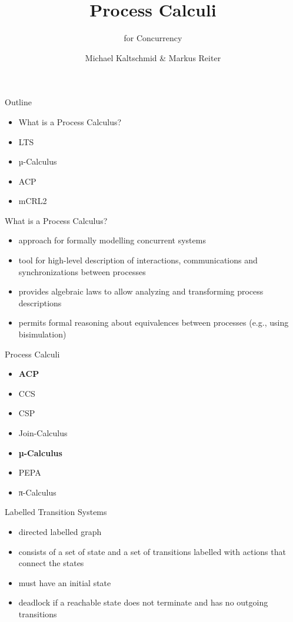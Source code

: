 \documentclass[aspectratio=1610]{beamer}
\title{Process Calculi}
\subtitle{for Concurrency}
\author{Michael Kaltschmid \& Markus Reiter}
\date{}
\begin{document}
  \maketitle

  \begin{frame}{Outline}
    \begin{itemize}
      \item What is a Process Calculus?
      \item LTS
      \item µ-Calculus
      \item ACP
      \item mCRL2
    \end{itemize}
  \end{frame}

  \begin{frame}{What is a Process Calculus?}
    \begin{itemize}
      \item approach for formally modelling concurrent systems
      \item tool for high-level description of interactions, communications and synchronizations between processes
      \item provides algebraic laws to allow analyzing and transforming process descriptions
      \item permits formal reasoning about equivalences between processes (e.g., using bisimulation)
    \end{itemize}
  \end{frame}

  \begin{frame}{Process Calculi}
    \begin{itemize}
      \item \textbf{ACP}
      \item CCS
      \item CSP
      \item Join-Calculus
      \item \textbf{µ-Calculus}
      \item PEPA
      \item π-Calculus
    \end{itemize}
  \end{frame}

  \begin{frame}{Labelled Transition Systems}
    \begin{itemize}
      \item directed labelled graph \\
      \item consists of a set of state and a set of transitions labelled with actions that connect the states \\
      \item must have an initial state \\
      \item deadlock if a reachable state does not terminate and has no outgoing transitions \\
    \end{itemize}
  \end{frame}
\end{document}
